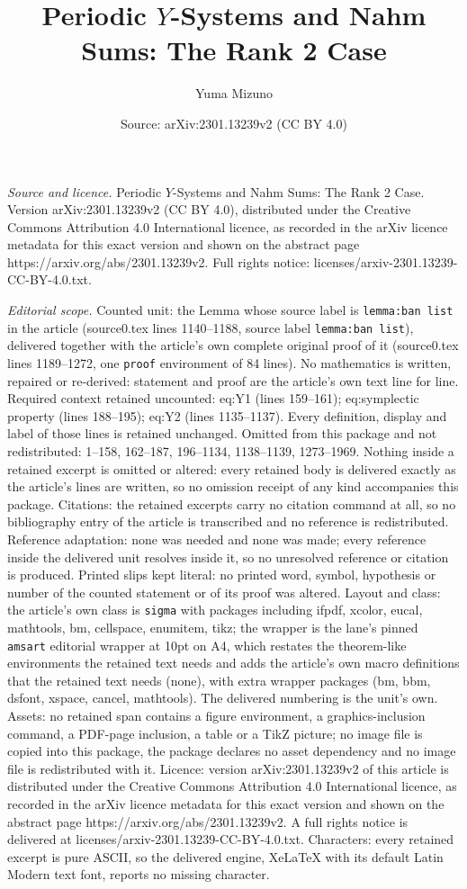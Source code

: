 \documentclass[10pt,a4paper]{amsart}
\title[Periodic $Y$-Systems and Nahm Sums: The Rank 2 Case]{Periodic $Y$-Systems and Nahm Sums: The Rank 2 Case}
\author{Yuma Mizuno}
\date{Source: arXiv:2301.13239v2 (CC BY 4.0)}
\begin{document}
\maketitle

\noindent\emph{Source and licence.} Periodic $Y$-Systems and Nahm Sums: The Rank 2 Case. Version arXiv:2301.13239v2 (CC BY 4.0), distributed under the Creative Commons Attribution 4.0 International licence, as recorded in the arXiv licence metadata for this exact version and shown on the abstract page https://arxiv.org/abs/2301.13239v2. Full rights notice: licenses/arxiv-2301.13239-CC-BY-4.0.txt.\par\smallskip

\noindent\textit{Editorial scope.} Counted unit: the Lemma whose source label is \texttt{lemma:ban list} in the article (source0.tex lines 1140--1188, source label \texttt{lemma:ban list}), delivered together with the article's own complete original proof of it (source0.tex lines 1189--1272, one \texttt{proof} environment of 84 lines). No mathematics is written, repaired or re-derived: statement and proof are the article's own text line for line. Required context retained uncounted: eq:Y1 (lines 159--161); eq:symplectic property (lines 188--195); eq:Y2 (lines 1135--1137). Every definition, display and label of those lines is retained unchanged. Omitted from this package and not redistributed: 1--158, 162--187, 196--1134, 1138--1139, 1273--1969. Nothing inside a retained excerpt is omitted or altered: every retained body is delivered exactly as the article's lines are written, so no omission receipt of any kind accompanies this package. Citations: the retained excerpts carry no citation command at all, so no bibliography entry of the article is transcribed and no reference is redistributed. Reference adaptation: none was needed and none was made; every reference inside the delivered unit resolves inside it, so no unresolved reference or citation is produced. Printed slips kept literal: no printed word, symbol, hypothesis or number of the counted statement or of its proof was altered. Layout and class: the article's own class is \texttt{sigma} with packages including ifpdf, xcolor, eucal, mathtools, bm, cellspace, enumitem, tikz; the wrapper is the lane's pinned \texttt{amsart} editorial wrapper at 10pt on A4, which restates the theorem-like environments the retained text needs and adds the article's own macro definitions that the retained text needs (none), with extra wrapper packages (bm, bbm, dsfont, xspace, cancel, mathtools). The delivered numbering is the unit's own. Assets: no retained span contains a figure environment, a graphics-inclusion command, a PDF-page inclusion, a table or a TikZ picture; no image file is copied into this package, the package declares no asset dependency and no image file is redistributed with it. Licence: version arXiv:2301.13239v2 of this article is distributed under the Creative Commons Attribution 4.0 International licence, as recorded in the arXiv licence metadata for this exact version and shown on the abstract page https://arxiv.org/abs/2301.13239v2. A full rights notice is delivered at licenses/arxiv-2301.13239-CC-BY-4.0.txt. Characters: every retained excerpt is pure ASCII, so the delivered engine, XeLaTeX with its default Latin Modern text font, reports no missing character.
\end{document}
